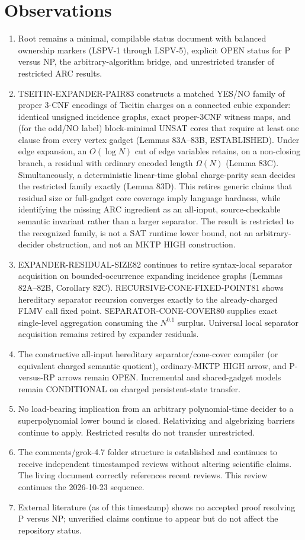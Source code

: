 \documentclass[11pt]{article}
\begin{document}
\section{Observations}
\begin{enumerate}
\item Root  remains a minimal, compilable status document with balanced ownership markers (LSPV-1 through LSPV-5), explicit OPEN status for P versus NP, the arbitrary-algorithm bridge, and unrestricted transfer of restricted ARC results.
\item TSEITIN-EXPANDER-PAIR83 constructs a matched YES/NO family of proper 3-CNF encodings of Tseitin charges on a connected cubic expander: identical unsigned incidence graphs, exact proper-3CNF witness maps, and (for the odd/NO label) block-minimal UNSAT cores that require at least one clause from every vertex gadget (Lemmas 83A--83B, ESTABLISHED). Under edge expansion, an $O(\log N)$ cut of edge variables retains, on a non-closing branch, a residual with ordinary encoded length $\Omega(N)$ (Lemma 83C). Simultaneously, a deterministic linear-time global charge-parity scan decides the restricted family exactly (Lemma 83D). This retires generic claims that residual size or full-gadget core coverage imply language hardness, while identifying the missing ARC ingredient as an all-input, source-checkable semantic invariant rather than a larger separator. The result is restricted to the recognized family, is not a SAT runtime lower bound, not an arbitrary-decider obstruction, and not an MKTP HIGH construction.
\item EXPANDER-RESIDUAL-SIZE82 continues to retire syntax-local separator acquisition on bounded-occurrence expanding incidence graphs (Lemmas 82A--82B, Corollary 82C). RECURSIVE-CONE-FIXED-POINT81 shows hereditary separator recursion converges exactly to the already-charged FLMV call fixed point. SEPARATOR-CONE-COVER80 supplies exact single-level aggregation consuming the $N^{0.1}$ surplus. Universal local separator acquisition remains retired by expander residuals.
\item The constructive all-input hereditary separator/cone-cover compiler (or equivalent charged semantic quotient), ordinary-MKTP HIGH arrow, and P-versus-RP arrows remain OPEN. Incremental and shared-gadget models remain CONDITIONAL on charged persistent-state transfer.
\item No load-bearing implication from an arbitrary polynomial-time decider to a superpolynomial lower bound is closed. Relativizing and algebrizing barriers continue to apply. Restricted results do not transfer unrestricted.
\item The comments/grok-4.7 folder structure is established and continues to receive independent timestamped reviews without altering scientific claims. The living document correctly references recent reviews. This review continues the 2026-10-23 sequence.
\item External literature (as of this timestamp) shows no accepted proof resolving P versus NP; unverified claims continue to appear but do not affect the repository status.
\end{enumerate}
\end{document}

